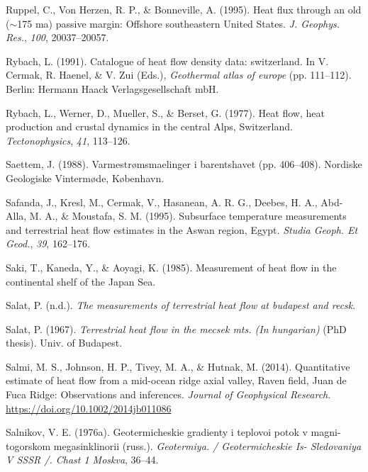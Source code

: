 \documentclass[draft,linenumbers]{agujournal2018}
\begin{document}
\leavevmode{}%
Ruppel, C., Von Herzen, R. P., \& Bonneville, A. (1995). Heat flux
through an old (\(\sim\)175 ma) passive margin: Offshore southeastern
{United States}. \emph{J. Geophys. Res.}, \emph{100}, 20037--20057.

\leavevmode{}%
Rybach, L. (1991). Catalogue of heat flow density data: switzerland. In
V. Cermak, R. Haenel, \& V. Zui (Eds.), \emph{Geothermal atlas of
europe} (pp. 111--112). Berlin: Hermann Haack Verlagsgesellschaft mbH.

\leavevmode{}%
Rybach, L., Werner, D., Mueller, S., \& Berset, G. (1977). Heat flow,
heat production and crustal dynamics in the central {Alps, Switzerland}.
\emph{Tectonophysics}, \emph{41}, 113--126.

\leavevmode{}%
Saettem, J. (1988). Varmestrømsmaelinger i barentshavet (pp. 406--408).
Nordiske Geologiske Vintermøde, København.

\leavevmode{}%
Safanda, J., Kresl, M., Cermak, V., Hasanean, A. R. G., Deebes, H. A.,
Abd-Alla, M. A., \& Moustafa, S. M. (1995). Subsurface temperature
measurements and terrestrial heat flow estimates in the {Aswan region,
Egypt}. \emph{Studia Geoph. Et Geod.}, \emph{39}, 162--176.

\leavevmode{}%
Saki, T., Kaneda, Y., \& Aoyagi, K. (1985). Measurement of heat flow in
the continental shelf of the {Japan Sea}.

\leavevmode{}%
Salat, P. (n.d.). \emph{The measurements of terrestrial heat flow at
budapest and recsk}.

\leavevmode{}%
Salat, P. (1967). \emph{Terrestrial heat flow in the mecsek mts. (In
hungarian)} (PhD thesis). Univ. of Budapest.

\leavevmode{}%
Salmi, M. S., Johnson, H. P., Tivey, M. A., \& Hutnak, M. (2014).
Quantitative estimate of heat flow from a mid-ocean ridge axial valley,
{Raven field, Juan de Fuca Ridge:} Observations and inferences.
\emph{Journal of Geophysical Research}.
\url{https://doi.org/10.1002/2014jb011086}

\leavevmode{}%
Salnikov, V. E. (1976a). Geotermicheskie gradienty i teplovoi potok v
magni- togorskom megasinklinorii (russ.). \emph{Geotermiya. /
Geotermicheskie Is- Sledovaniya V SSSR /. Chast 1 Moskva}, 36--44.
\end{document}
